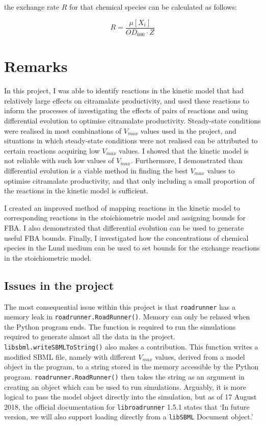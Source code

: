 \documentclass[parskip=full]{scrreprt}
\begin{document}
the exchange rate $R$ for that chemical species can be calculated as follows:

\[
  R = \frac{\mu[X_{i}]}{OD_{600} \cdot Z}
\]

\chapter{Remarks}
\label{ch:remarks}

In this project, I was able to identify reactions in the kinetic model that had relatively large effects on citramalate productivity, and used these reactions to inform the processes of investigating the effects of pairs of reactions and using differential evolution to optimise citramalate productivity. Steady-state conditions were realised in most combinations of $V_{max}$ values used in the project, and situations in which steady-state conditions were not realised can be attributed to certain reactions acquiring low $V_{max}$ values. I showed that the kinetic model is not reliable with such low values of $V_{max}$. Furthermore, I demonstrated than differential evolution is a viable method in finding the best $V_{max}$ values to optimise citramalate productivity, and that only including a small proportion of the reactions in the kinetic model is sufficient.

I created an improved method of mapping reactions in the kinetic model to corresponding reactions in the stoichiometric model and assigning bounds for FBA. I also demonstrated that differential evolution can be used to generate useful FBA bounds. Finally, I investigated how the concentrations of chemical species in the Lund medium can be used to set bounds for the exchange reactions in the stoichiometric model.

\section{Issues in the project}
\label{sec:issues}

The most consequential issue within this project is that \texttt{roadrunner} has a memory leak in \texttt{roadrunner.RoadRunner()}. Memory can only be relased when the Python program ends. The function is required to run the simulations required to generate almost all the data in the project. \texttt{libsbml.writeSBMLToString()} also makes a contribution. This function writes a modified SBML file, namely with different $V_{max}$ values, derived from a model object in the program, to a string stored in the memory accessible by the Python program. \texttt{roadrunner.RoadRunner()} then takes the string as an argument in creating an object which can be used to run simulations. Arguably, it is more logical to pass the model object directly into the simulation, but as of 17 August 2018, the official documentation for \texttt{libroadrunner} 1.5.1 states that `In future version, we will also support loading directly from a \texttt{libSBML} Document object.'
\end{document}
